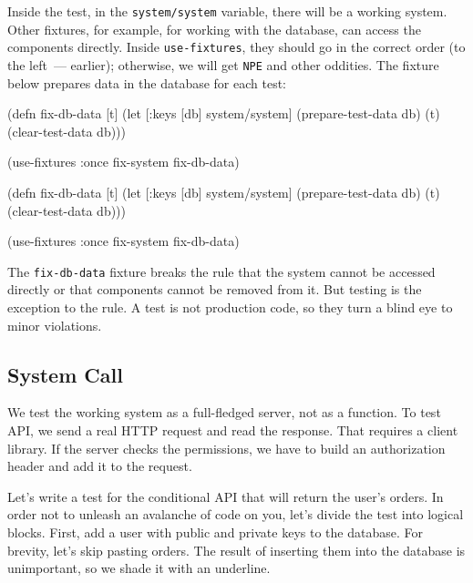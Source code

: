 Inside the test, in the \verb|system/system| variable, there will be a working system. Other fixtures, for example, for working with the database, can access the components directly. Inside \verb|use-fixtures|, they should go in the correct order (to the left~--- earlier); otherwise, we will get \verb|NPE| and other oddities. The fixture below prepares data in the database for each test:


\ifx\DEVICETYPE\MOBILE

\begin{english}
  \begin{clojure}
(defn fix-db-data
  [t]
  (let [{:keys [db]} system/system]
    (prepare-test-data db)
    (t)
    (clear-test-data db)))

(use-fixtures :once
  fix-system fix-db-data)
  \end{clojure}
\end{english}

\else

\begin{english}
  \begin{clojure}
(defn fix-db-data
  [t]
  (let [{:keys [db]} system/system]
    (prepare-test-data db)
    (t)
    (clear-test-data db)))

(use-fixtures :once fix-system fix-db-data)
  \end{clojure}
\end{english}

\fi

The \verb|fix-db-data| fixture breaks the rule that the system cannot be accessed directly or that components cannot be removed from it. But testing is the exception to the rule. A test is not production code, so they turn a blind eye to minor violations.

\subsection{System Call}

We test the working system as a full-fledged server, not as a function. To test API, we send a real HTTP request and read the response. That requires a client library. If the server checks the permissions, we have to build an authorization header and add it to the request.

Let's write a test for the conditional API that will return the user's orders. In order not to unleash an avalanche of code on you, let's divide the test into logical blocks. First, add a user with public and private keys to the database. For brevity, let's skip pasting orders. The result of inserting them into the database is unimportant, so we shade it with an underline.

